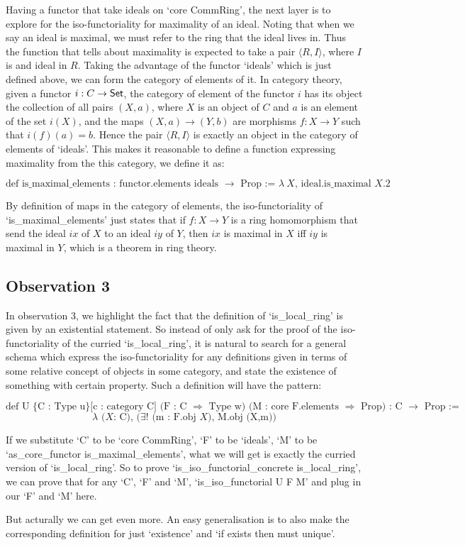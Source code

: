 \documentclass[11pt]{article}
\begin{document}
Having a functor that take ideals on `core CommRing', the next layer is to explore for the iso-functoriality for maximality of an ideal. Noting that when we say an ideal is maximal, we must refer to the ring that the ideal lives in. Thus the function that tells about maximality is expected to take a pair $\langle R,I\rangle$, where $I$ is and ideal in $R$. Taking the advantage of the functor `ideals' which is just defined above, we can form the category of elements of it. In category theory, given a functor $i: C\to {\sf Set}$, the category of element of the functor $i$ has its object the collection of all pairs $(X,a)$, where $X$ is an object of $C$ and $a$ is an element of the set $i(X)$, and the maps $(X,a)\to (Y,b)$ are morphisms $f:X\to Y$ such that $i(f)(a)=b$. Hence the pair $\langle R,I\rangle$ is exactly an object in the category of elements of `ideals'. This makes it reasonable to define a function expressing maximality from the this category, we define it as:

\[\text{def is\_maximal\_elements : functor.elements ideals $\to$ Prop := $\lambda \ X$, ideal.is\_maximal $X.2$}\]

By definition of maps in the category of elements, the iso-functoriality of `is\_maximal\_elements' just states that if $f: X\to Y$ is a ring homomorphism that send the ideal $ix$ of $X$ to an ideal $iy$ of $Y$, then $ix$ is maximal in $X$ iff $iy$ is maximal in $Y$, which is a theorem in ring theory.

\subsection{Observation 3}

In observation 3, we highlight the fact that the definition of `is\_local\_ring' is given by an existential statement. So instead of only ask for the proof of the iso-functoriality of the curried `is\_local\_ring', it is natural to search for a general schema which express the iso-functoriality for any definitions given in terms of some relative concept of objects in some category, and state the existence of something with certain property. Such a definition will have the pattern:

\[\text{def U \{C : Type u\} [c : category C] (F : C $\Rightarrow$ Type w) (M : core F.elements $\Rightarrow$ Prop) : C $\to$ Prop :=}\]
  \[\text{$\lambda$ ($X$: C), ($\exists !$ (m : F.obj $X$), M.obj (X,m))}\]

If we substitute `C' to be `core CommRing', `F' to be `ideals', `M' to be `as\_core\_functor is\_maximal\_elements', what we will get is exactly the curried version of `is\_local\_ring'. So to prove `is\_iso\_functorial\_concrete is\_local\_ring', we can prove that for any `C', `F' and `M', `is\_iso\_functorial U F M' and plug in our `F' and `M' here. 

But acturally we can get even more. An easy generalisation is to also make the corresponding definition for just `existence' and `if exists then must unique'. 
\end{document}
